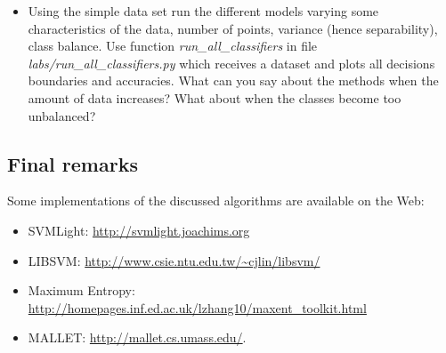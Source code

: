 \begin{exercise}
\begin{itemize}
\item Using the simple data set run the different models varying some
  characteristics of the data, number of points, variance (hence
  separability), class balance. Use function
  \emph{run\_all\_classifiers} in file \emph{labs/run\_all\_classifiers.py} which receives a
  dataset and plots all decisions boundaries and accuracies. What can
  you say about the methods when the amount of data increases? What
  about when the classes become too unbalanced?
\end{itemize}
\end{exercise}


\subsection{Final remarks}


Some implementations of the discussed algorithms are available on the Web: 
\begin{itemize}
\item SVMLight: \url{http://svmlight.joachims.org}
\item LIBSVM: \url{http://www.csie.ntu.edu.tw/~cjlin/libsvm/}
\item Maximum Entropy: \url{http://homepages.inf.ed.ac.uk/lzhang10/maxent_toolkit.html}
\item MALLET: \url{http://mallet.cs.umass.edu/}.
\end{itemize} 



